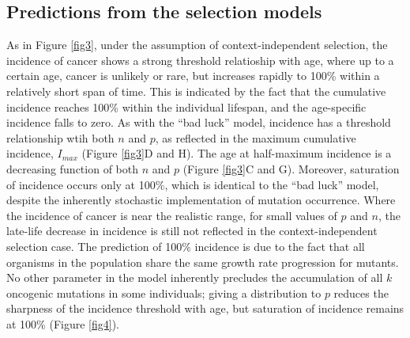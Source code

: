 \documentclass[9pt,onecolumn,twoside]{pnas-new}
\begin{document}
\subsection*{Predictions from the selection models}
As in Figure \ref{fig3}, under the assumption of context-independent selection, the incidence of cancer shows a strong threshold relatioship with age, where up to a certain age, cancer is unlikely or rare, but increases rapidly to 100\% within a relatively short span of time. This is indicated by the fact that the cumulative incidence reaches 100\% within the individual lifespan, and the age-specific incidence falls to zero. As with the ``bad luck'' model, incidence has a threshold relationship wtih both $n$ and $p$, as reflected in the maximum cumulative incidence, $I_{max}$ (Figure \ref{fig3}D and H). The age at half-maximum incidence is a decreasing function of both $n$ and $p$ (Figure \ref{fig3}C and G). Moreover, saturation of incidence occurs only at 100\%, which is identical to the ``bad luck'' model, despite the inherently stochastic implementation of mutation occurrence. Where the incidence of cancer is near the realistic range, for small values of $p$ and $n$, the late-life decrease in incidence is still not reflected in the context-independent selection case. The prediction of 100\% incidence is due to the fact that all organisms in the population share the same growth rate progression for mutants. No other parameter in the model inherently precludes the accumulation of all $k$ oncogenic mutations in some individuals; giving a distribution to $p$ reduces the sharpness of the incidence threshold with age, but saturation of incidence remains at 100\% (Figure \ref{fig4}). 
\end{document}
